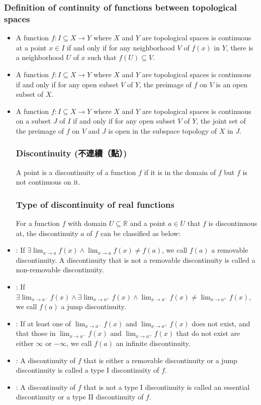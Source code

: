 \documentclass[a4paper,12pt]{report}
\begin{document}
\begin{itemize}
\subsubsection{Definition of continuity of functions between topological spaces}
\begin{itemize}
\item A function $f\colon I\subseteq X\to Y$ where $X$ and $Y$ are topological spaces is continuous at a point $x\in I$ if and only if for any neighborhood $V$ of $f(x)$ in $Y$, there is a neighborhood $U$ of $x$ such that $f(U)\subseteq V$.
\item A function $f\colon I\subseteq X\to Y$ where $X$ and $Y$ are topological spaces is continuous if and only if for any open subset $V$ of $Y$, the preimage of $f$ on $V$ is an open subset of $X$.
\item A function $f\colon I\subseteq X\to Y$ where $X$ and $Y$ are topological spaces is continuous on a subset $J$ of $I$ if and only if for any open subset $V$ of $Y$, the joint set of the preimage of $f$ on $V$ and $J$ is open in the subspace topology of $X$ in $J$.
\eit
\subsubsection{Discontinuity (不連續（點）)}
A point is a discontinuity of a function $f$ if it is in the domain of $f$ but $f$ is not continuous on it.
\subsubsection{Type of discontinuity of real functions}
For a function $f$ with domain $U\subseteq\mathbb{R}$ and a point $a\in U$ that $f$ is discontinuous at, the discontinuity $a$ of $f$ can be classified as below:
\bit
\item {}: If $\exists\lim_{x\to a}f(x)\land\lim_{x\to a}f(x)\neq f(a)$, we call $f(a)$ a removable discontinuity. A discontinuity that is not a removable discontinuity is called a non-removable discontinuity.
\item {}: If $\exists\lim_{x\to a^-}f(x)\land\exists\lim_{x\to a^+}f(x)\land\lim_{x\to a^-}f(x)\neq\lim_{x\to a^+}f(x)$, we call $f(a)$ a jump discontinuity.
\item{}: If at least one of $\lim_{x\to a^-}f(x)$ and $\lim_{x\to a^+}f(x)$ does not exist, and that those in $\lim_{x\to a^-}f(x)$ and $\lim_{x\to a^+}f(x)$ that do not exist are either $\infty$ or $-\infty$, we call $f(a)$ an infinite discontinuity.
\item{}: A discontinuity of $f$ that is either a removable discontinuity or a jump discontinuity is called a type I discontinuity of $f$.
\item{}: A discontinuity of $f$ that is not a type I discontinuity is called an essential discontinuity or a type II discontinuity of $f$.
\eit

\end{itemize}
\end{itemize}
\end{document}
